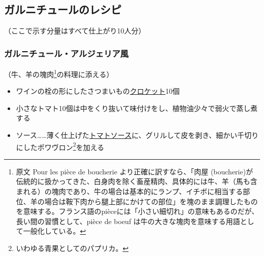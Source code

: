 \href{未、原文対照チェック}{} \href{未、日本語表現校正}{}
\href{未、その他修正}{} \href{未、原稿最終校正}{}

\hypertarget{garnitures-recettes}{%
\subsection{ガルニチュールのレシピ}\label{garnitures-recettes}}


\begin{center}
\medlarge（ここで示す分量はすべて仕上がり10人分）
\end{center}
\normalsize
\begin{recette}
\hypertarget{garniture-algerienne}{%
\subsubsection{ガルニチュール・アルジェリア風}\label{garniture-algerienne}}



（牛、羊の塊肉\footnote{原文 Pour les pièce de boucherie
  より正確に訳すなら、「肉屋
  (boucherie)が伝統的に扱かってきた、白身肉を除く畜産精肉、具体的には牛、羊（馬も含まれる）の塊肉であり、牛の場合は基本的にランプ、イチボに相当する部位、羊の場合は鞍下肉から腿上部にかけての部位」を塊のまま調理したものを意味する。フランス語のpièceには「小さい細切れ」の意味もあるのだが、長い間の習慣として、pièce
  de boeuf は牛の大きな塊肉を意味する用語として一般化している。}の料理に添える）

\begin{itemize}
\item
  ワインの栓の形にしたさつまいもの\protect\hyperlink{croquettes}{クロケット}10個
\item
  小さなトマト10個は中をくり抜いて味付けをし、植物油少々で弱火で蒸し煮する
\item
  ソース\ldots{}\ldots{}薄く仕上げた\protect\hyperlink{sauce-tomate}{トマトソース}に、グリルして皮を剥き、細かい千切りにしたポワヴロン\footnote{いわゆる青果としてのパプリカ。}を加える
\end{itemize}

\hypertarget{garniture-alsacienne}{%
}
\end{recette}

